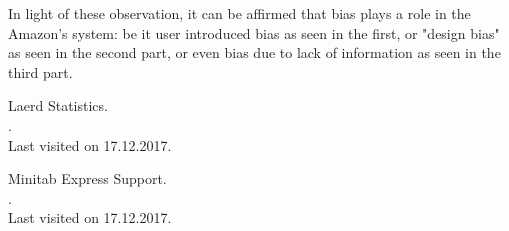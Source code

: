 \documentclass[11pt]{article}
\begin{document}
In light of these observation, it can be affirmed that bias plays a role in the Amazon's system: be it user introduced bias as seen in the first, or "design bias" as seen in the second part, or even bias due to lack of information as seen in the third part.


\begin{thebibliography}{}

 Laerd Statistics.\\
.\\
\newblock Last visited on 17.12.2017.

Minitab Express Support.\\
.\\
\newblock Last visited on 17.12.2017.

\end{thebibliography}
\end{document}
